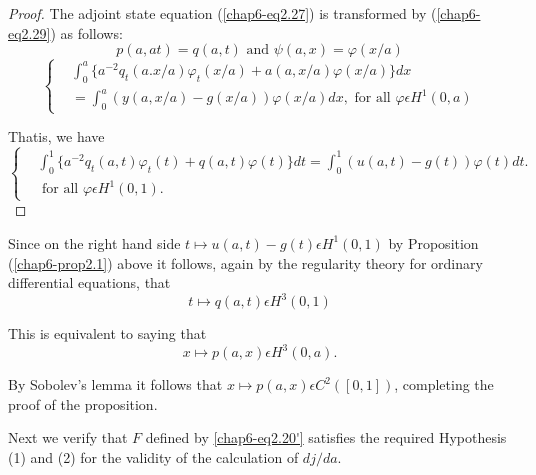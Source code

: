 \begin{proof}
The adjoint state equation (\ref{chap6-eq2.27}) is transformed by (\ref{chap6-eq2.29}) as follows:
$$
p(a, at) = q(a, t) \text{ and } \psi (a, x) = \varphi (x/a)
$$
\begin{equation*}
\begin{cases}
& \int_{0}^{a} \{a^{-2} q_{t} (a. x/a) \varphi_{t} (x/a) + a(a, x/a) \varphi(x/a) \}dx\\
& = \int_{0}^{a} (y(a, x/a) - g(x/a)) \varphi(x/a) dx, \text{ for all } \varphi \epsilon H^{1} (0, a)
\end{cases}
\end{equation*}

That\pageoriginale is, we have
\begin{equation*}
\begin{cases}
& \int_{0}^{1} \{a^{-2} q_{t} (a, t) \varphi_{t} (t) + q(a,
  t)\varphi(t) \} dt = \int_{0}^{1} (u(a, t) - g(t)) \varphi(t) dt.\\ 
& \text{ for all } \varphi \epsilon H^{1} (0, 1).\tag{2.40}\label{chap6-eq2.40}
\end{cases}
\end{equation*}
\end{proof}

Since on the right hand side $t \mapsto u(a, t) - g(t) \epsilon H^{1}
(0, 1)$ by Proposition (\ref{chap6-prop2.1}) above it follows, again
by the regularity theory for ordinary differential equations, that 
\begin{equation*}
t \mapsto q(a, t) \epsilon H^{3} (0, 1)\tag{2.41}\label{chap6-eq2.41}
\end{equation*}

This is equivalent to saying that
\begin{equation*}
x \mapsto p(a, x) \epsilon H^{3} (0, a).\tag*{$(2.41)'$}
\end{equation*}

By Sobolev's lemma it follows that $x \mapsto p(a, x) \epsilon C^{2}
([0, 1])$, completing the proof of the proposition. 

Next we verify that $F$ defined by \ref{chap6-eq2.20'} satisfies the
required Hypothesis (1) and (2) for the validity of the calculation of
$dj/da$. 

